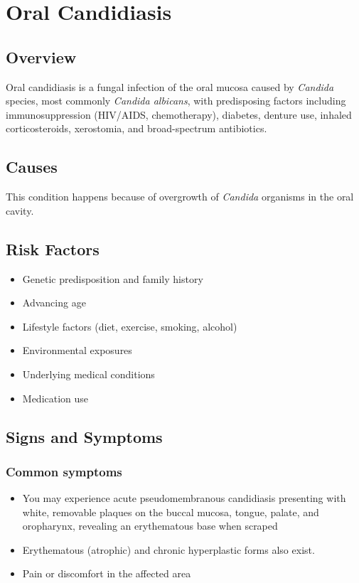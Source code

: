 \chapter{Oral Candidiasis}
\label{sec:Oral Candidiasis}

\section{Overview}
Oral candidiasis is a fungal infection of the oral mucosa caused by \textit{Candida} species, most commonly \textit{Candida albicans}, with predisposing factors including immunosuppression (HIV/AIDS, chemotherapy), diabetes, denture use, inhaled corticosteroids, xerostomia, and broad-spectrum antibiotics.
\section{Causes}
This condition happens because of overgrowth of \textit{Candida} organisms in the oral cavity.     
\section{Risk Factors}

\begin{itemize}[noitemsep]
  \item Genetic predisposition and family history
  \item Advancing age
  \item Lifestyle factors (diet, exercise, smoking, alcohol)
  \item Environmental exposures
  \item Underlying medical conditions
  \item Medication use
\end{itemize}
\section{Signs and Symptoms}

\subsection{Common symptoms}
\begin{itemize}[noitemsep]
  \item You may experience acute pseudomembranous candidiasis presenting with white, removable plaques on the buccal mucosa, tongue, palate, and oropharynx, revealing an erythematous base when scraped
  \item Erythematous (atrophic) and chronic hyperplastic forms also exist.
  \item Pain or discomfort in the affected area
  \end{itemize}

